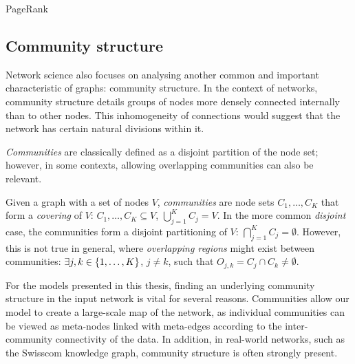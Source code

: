 \begin{algorithm}[H]
\caption{PageRank}
\label{algorithm:pagerank}
\begin{algorithmic}
\end{algorithmic}
\end{algorithm}

\subsection{Community structure}
Network science also focuses on analysing another common and important characteristic of graphs: community structure. In the context of networks, community structure details groups of nodes more densely connected internally than to other nodes. This inhomogeneity of connections would suggest that the network has certain natural divisions within it.

\emph{Communities} are classically defined as a disjoint partition of the node set; however, in some contexts, allowing overlapping communities can also be relevant.
\begin{definition}
Given a graph with a set of nodes $V$, \emph{communities} are node sets $C_1, \dots, C_K$ that form a \emph{covering} of $V$: $C_1, \dots, C_K \subseteq V$, $\bigcup_{j=1}^{K}{C_j} = V$. In the more common \emph{disjoint} case, the communities form a disjoint partitioning of $V$: $\bigcap_{j=1}^{K}{C_j}=\emptyset$. However, this is not true in general, where \emph{overlapping regions} might exist between communities: $\exists j,k \in \mathopen{}\left\{1,\dots,K\right\}$, $j \neq k$, such that $O_{j,k} = C_j \cap C_k \neq \emptyset$.
\end{definition} 

For the models presented in this thesis, finding an underlying community structure in the input network is vital for several reasons. Communities allow our model to create a large-scale map of the network, as individual communities can be viewed as meta-nodes linked with meta-edges according to the inter-community connectivity of the data. In addition, in real-world networks, such as the Swisscom knowledge graph, community structure is often strongly present.

